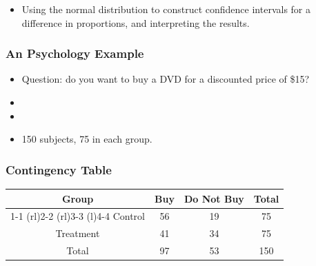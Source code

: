 \documentclass{beamer}
\begin{document}
\begin{frame}
  \begin{itemize}
    \item[] 
      Using the normal distribution to construct confidence intervals
      for a difference in proportions, and interpreting the results.
  \end{itemize}
\end{frame}

\begin{frame}
  \frametitle{An Psychology Example}
  \begin{itemize}
    \item[] 
      Question: do you want to buy a DVD for a discounted price of
      \$15? 
      \vspace{0.5cm}
    \item[] 
      \vspace{0.5cm}
    \item[] 
      \vspace{0.5cm}
    \item[] 
      150 subjects, 75 in each group. 
  \end{itemize}
\end{frame}

\begin{frame}
  \frametitle{Contingency Table}
  \begin{table}
    \begin{tabular}{@{}cccc@{}}
      \toprule
      Group & Buy & Do Not Buy & Total \\
      \cmidrule(r){1-1} \cmidrule(rl){2-2} \cmidrule(rl){3-3}
      \cmidrule(l){4-4}
      Control & 56 & 19 & 75 \\[0.3em]
      Treatment & 41 & 34 & 75 \\[0.3em]
      Total & 97 & 53 & 150 \\
      \bottomrule
    \end{tabular}
  \end{table}
\end{frame}
\end{document}
